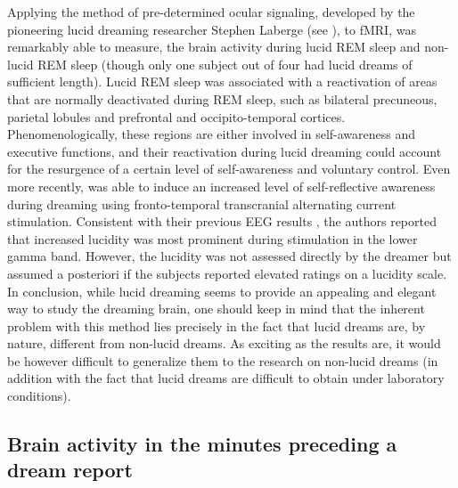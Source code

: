 Applying the method of pre-determined ocular signaling, developed by the pioneering lucid dreaming researcher Stephen Laberge (see \citealp{laberge_exploring_1991}), to fMRI, \citet{dresler_neural_2012} was remarkably able to measure, the brain activity during lucid REM sleep and non-lucid REM sleep (though only one subject out of four had lucid dreams of sufficient length). Lucid REM sleep was associated with a reactivation of areas that are normally deactivated during REM sleep, such as bilateral precuneous, parietal lobules and prefrontal and occipito-temporal cortices. Phenomenologically, these regions are either involved in self-awareness and executive functions, and their reactivation during lucid dreaming could account for the resurgence of a certain level of self-awareness and voluntary control. Even more recently, \citet{voss_induction_2014} was able to induce an increased level of self-reflective awareness during dreaming using fronto-temporal transcranial alternating current stimulation. Consistent with their previous EEG results \citep{voss_lucid_2009}, the authors reported that increased lucidity was most prominent during stimulation in the lower gamma band. However, the lucidity was not assessed directly by the dreamer but assumed a posteriori if the subjects reported elevated ratings on a lucidity scale. In conclusion, while lucid dreaming seems to provide an appealing and elegant way to study the dreaming brain, one should keep in mind that the inherent problem with this method lies precisely in the fact that lucid dreams are, by nature, different from non-lucid dreams. As exciting as the results are, it would be however difficult to generalize them to the research on non-lucid dreams (in addition with the fact that lucid dreams are difficult to obtain under laboratory conditions).

\subsection{Brain activity in the minutes preceding a dream report}
\label{sec:dream-research:attempts:ba-pre}


